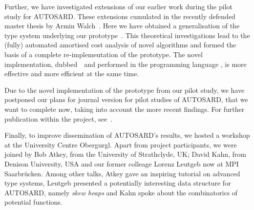\documentclass[10pt,a4paper]{article}
\begin{document}
Further, we have investigated extensions of our earlier work during the pilot study for AUTOSARD.
These extensions cumulated in the recently defended master thesis by Armin Walch~\cite{Walch:2025}. Here we have obtained a generalisation of the type system
underlying our prototype~\atlas. This theoretical investigations lead to the (fully) automated amortised
cost analysis of novel algorithms and formed the basis of a complete re-implementation of the prototype. The novel implementation, dubbed~\newatlas\ and performed in the programming language \Haskell, is more effective and more efficient at the same time.

Due to the novel implementation of the prototype from our pilot study, we have postponed our plans for journal version for pilot studies of AUTOSARD, that we want to complete
now, taking into account the more recent findings.
%
For further publication within the project, see~\cite{AvanziniMPP24}.

Finally, to improve dissemination of AUTOSARD's results, we hosted a workshop at the University Centre Obergurgl. Apart from project participants, we were joined by Bob Atkey, from the University of Strathclyde, UK; David Kahn, from Denison University, USA and our former colleage Lorenz Leutgeb now at MPI Saarbrücken. Among other talks, Atkey gave an inspiring tutorial on advanced type systems, Leutgeb presented a potentially interesting data structure for AUTOSARD, namely \emph{skew heaps} and Kahn spoke about the combinatorics of potential functions.


\small

\end{document}
